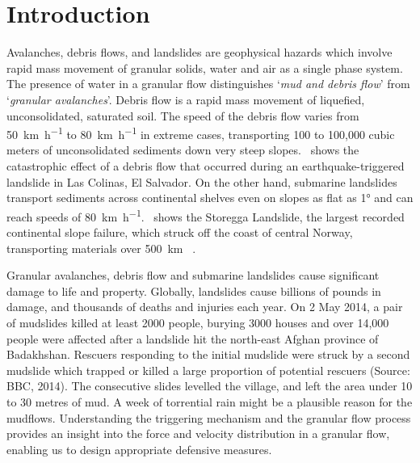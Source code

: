 \chapter{Introduction}

\ifpdf
    \graphicspath{{Chapter1/figs/raster/}{Chapter1/figs/pdf/}{Chapter1/figs/}}
\else
    \graphicspath{{Chapter1/figs/vector/}{Chapter1/figs/}}
\fi

Avalanches, debris flows, and landslides are geophysical hazards which involve 
rapid mass movement of granular solids, water and air as a single phase system. 
The presence of water in a granular flow distinguishes `\textit{mud and debris 
flow}' from `\textit{granular avalanches}'. Debris flow is a rapid mass 
movement of liquefied, unconsolidated, saturated soil. The speed of the debris 
flow varies from 50~\si{\km\per\hour} to 80~\si{\km\per\hour} in extreme cases, 
transporting 100 to 100,000 cubic meters of unconsolidated sediments down very 
steep slopes.~ shows the catastrophic effect of a debris flow 
that occurred during an earthquake-triggered landslide in Las Colinas,  El 
Salvador. On the other hand, submarine landslides transport sediments across 
continental shelves even on slopes as flat as 1\si{\degree} and can reach 
speeds of 80~\si{\km\per\hour}.~ shows the Storegga 
Landslide, the largest recorded continental slope failure, which struck off the 
coast of central Norway, transporting materials over 500~\si{\km} 
~\citep{Ward2002}. 

Granular avalanches, debris flow and submarine landslides cause significant 
damage to life and property. Globally, landslides cause billions of pounds in 
damage, and thousands of deaths and injuries each year. On 2 May 2014, a pair 
of mudslides killed at least 2000 people, burying 3000 houses and over 14,000 
people were affected after a landslide hit the north-east Afghan province of 
Badakhshan. Rescuers responding to the initial mudslide were struck by a second 
mudslide which trapped or killed a large proportion of potential rescuers 
(Source: BBC, 2014). The consecutive slides levelled the village, and left the 
area under 10 to 30 metres of mud. A week of torrential rain might be a 
plausible reason for the mudflows. Understanding the triggering mechanism and 
the granular flow process provides an insight into the force and velocity 
distribution in a granular flow, enabling us to design appropriate defensive 
measures. 


